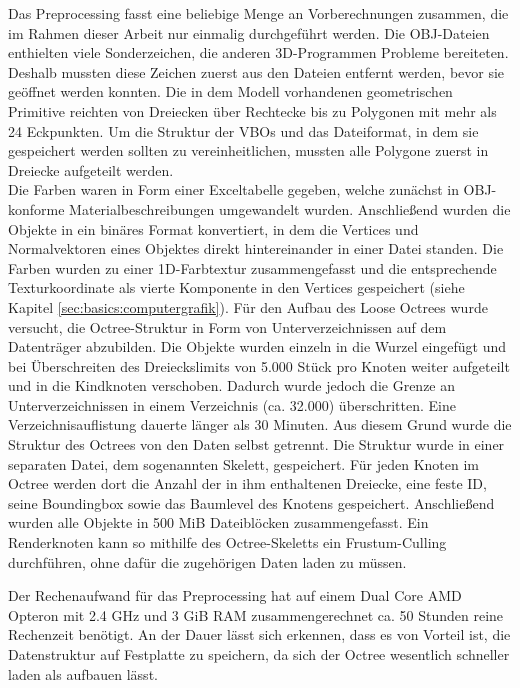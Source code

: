 Das Preprocessing fasst eine beliebige Menge an Vorberechnungen zusammen, die im Rahmen dieser Arbeit nur einmalig durchgeführt werden. Die OBJ-Dateien enthielten viele Sonderzeichen, die anderen 3D-Programmen Probleme bereiteten. Deshalb mussten diese Zeichen zuerst aus den Dateien entfernt werden, bevor sie geöffnet werden konnten. Die in dem Modell vorhandenen geometrischen Primitive reichten von Dreiecken über Rechtecke bis zu Polygonen mit mehr als 24 Eckpunkten. Um die Struktur der VBOs und das Dateiformat, in dem sie gespeichert werden sollten zu vereinheitlichen, mussten alle Polygone zuerst in Dreiecke aufgeteilt werden. \\
Die Farben waren in Form einer Exceltabelle gegeben, welche zunächst in OBJ-konforme Materialbeschreibungen umgewandelt wurden. Anschließend wurden die Objekte in ein binäres Format konvertiert, in dem die Vertices und Normalvektoren eines Objektes direkt hintereinander in einer Datei standen. Die Farben wurden zu einer 1D-Farbtextur zusammengefasst und die entsprechende Texturkoordinate als vierte Komponente in den Vertices gespeichert (siehe Kapitel \ref{sec:basics:computergrafik}). Für den Aufbau des Loose Octrees wurde versucht, die Octree-Struktur in Form von Unterverzeichnissen auf dem Datenträger abzubilden. Die Objekte wurden einzeln in die Wurzel eingefügt und bei Überschreiten des Dreieckslimits von 5.000 Stück pro Knoten weiter aufgeteilt und in die Kindknoten verschoben. Dadurch wurde jedoch die Grenze an Unterverzeichnissen in einem Verzeichnis (ca. 32.000) überschritten. Eine Verzeichnisauflistung dauerte länger als 30 Minuten. Aus diesem Grund wurde die Struktur des Octrees von den Daten selbst getrennt. Die Struktur wurde in einer separaten Datei, dem sogenannten Skelett, gespeichert. Für jeden Knoten im Octree werden dort die Anzahl der in ihm enthaltenen Dreiecke, eine feste ID, seine Boundingbox sowie das Baumlevel des Knotens gespeichert. Anschließend wurden alle Objekte in 500 MiB Dateiblöcken zusammengefasst. Ein Renderknoten kann so mithilfe des Octree-Skeletts ein Frustum-Culling durchführen, ohne dafür die zugehörigen Daten laden zu müssen.

Der Rechenaufwand für das Preprocessing hat auf einem Dual Core AMD Opteron mit 2.4 GHz und 3 GiB RAM zusammengerechnet ca. 50 Stunden reine Rechenzeit benötigt. An der Dauer lässt sich erkennen, dass es von Vorteil ist, die Datenstruktur auf Festplatte zu speichern, da sich der Octree wesentlich schneller laden als aufbauen lässt.

